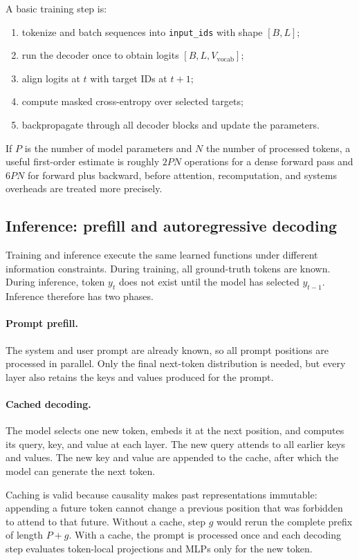 A basic training step is:
\begin{enumerate}
  \item tokenize and batch sequences into \texttt{input\_ids} with shape $[B,L]$;
  \item run the decoder once to obtain logits $[B,L,V_{\mathrm{vocab}}]$;
  \item align logits at $t$ with target IDs at $t+1$;
  \item compute masked cross-entropy over selected targets;
  \item backpropagate through all decoder blocks and update the parameters.
\end{enumerate}
If $P$ is the number of model parameters and $N$ the number of processed tokens, a useful
first-order estimate is roughly $2PN$ operations for a dense forward pass and $6PN$ for
forward plus backward, before attention, recomputation, and systems overheads are treated
more precisely.

\subsection{Inference: prefill and autoregressive decoding}

Training and inference execute the same learned functions under different information
constraints. During training, all ground-truth tokens are known. During inference, token
$y_t$ does not exist until the model has selected $y_{t-1}$. Inference therefore has two
phases.

\paragraph{Prompt prefill.}
The system and user prompt are already known, so all prompt positions are processed in
parallel. Only the final next-token distribution is needed, but every layer also retains
the keys and values produced for the prompt.

\paragraph{Cached decoding.}
The model selects one new token, embeds it at the next position, and computes its query,
key, and value at each layer. The new query attends to all earlier keys and values. The
new key and value are appended to the cache, after which the model can generate the next
token.

Caching is valid because causality makes past representations immutable: appending a
future token cannot change a previous position that was forbidden to attend to that
future. Without a cache, step $g$ would rerun the complete prefix of length $P+g$. With a
cache, the prompt is processed once and each decoding step evaluates token-local
projections and MLPs only for the new token.

